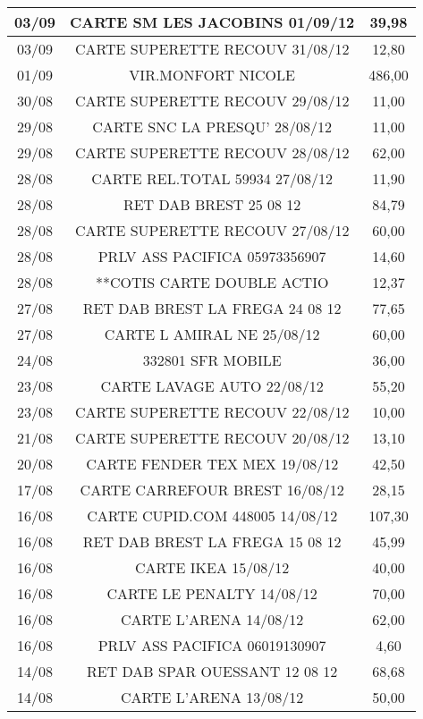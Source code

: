 \begin{tabular}{|c|c|c|}
\hline
03/09 & CARTE SM LES JACOBINS  01/09/12 & 39,98 \\
\hline
03/09 & CARTE SUPERETTE RECOUV 31/08/12 & 12,80 \\
\hline
01/09 & VIR.MONFORT NICOLE & 486,00 \\
\hline
30/08 & CARTE SUPERETTE RECOUV 29/08/12 & 11,00 \\
\hline
29/08 & CARTE SNC  LA PRESQU'  28/08/12 & 11,00 \\
\hline
29/08 & CARTE SUPERETTE RECOUV 28/08/12 & 62,00 \\
\hline
28/08 & CARTE REL.TOTAL 59934  27/08/12 & 11,90 \\
\hline
28/08 & RET DAB BREST          25 08 12 & 84,79 \\
\hline
28/08 & CARTE SUPERETTE RECOUV 27/08/12 & 60,00 \\
\hline
28/08 & PRLV   ASS PACIFICA  05973356907 & 14,60 \\
\hline
28/08 & **COTIS CARTE DOUBLE ACTIO & 12,37 \\
\hline
27/08 & RET DAB BREST LA FREGA 24 08 12 & 77,65 \\
\hline
27/08 & CARTE L AMIRAL NE      25/08/12 & 60,00 \\
\hline
24/08 & 332801 SFR MOBILE & 36,00 \\
\hline
23/08 & CARTE LAVAGE AUTO      22/08/12 & 55,20 \\
\hline
23/08 & CARTE SUPERETTE RECOUV 22/08/12 & 10,00 \\
\hline
21/08 & CARTE SUPERETTE RECOUV 20/08/12 & 13,10 \\
\hline
20/08 & CARTE FENDER TEX MEX   19/08/12 & 42,50 \\
\hline
17/08 & CARTE CARREFOUR BREST  16/08/12 & 28,15 \\
\hline
16/08 & CARTE CUPID.COM 448005 14/08/12 & 107,30 \\
\hline
16/08 & RET DAB BREST LA FREGA 15 08 12 & 45,99 \\
\hline
16/08 & CARTE IKEA             15/08/12 & 40,00 \\
\hline
16/08 & CARTE LE PENALTY       14/08/12 & 70,00 \\
\hline
16/08 & CARTE L'ARENA          14/08/12 & 62,00 \\
\hline
16/08 & PRLV   ASS PACIFICA  06019130907 & 4,60 \\
\hline
14/08 & RET DAB SPAR OUESSANT  12 08 12 & 68,68 \\
\hline
14/08 & CARTE L'ARENA          13/08/12 & 50,00 \\

\end{tabular}
